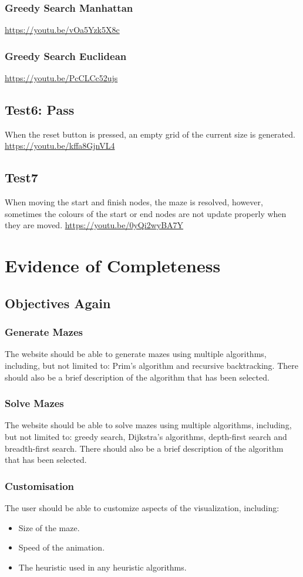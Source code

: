 \documentclass[titlepage]{article}
\begin{document}
\subsubsection{Greedy Search Manhattan}
\url{https://youtu.be/vOa5Yzk5X8c}
\subsubsection{Greedy Search Euclidean}
\url{https://youtu.be/PcCLCc52ujs}
\subsection{Test6: Pass}
When the reset button is pressed, an empty grid of the current size is generated. \url{https://youtu.be/kffa8GjnVL4}
\subsection{Test7}
When moving the start and finish nodes, the maze is resolved, however, sometimes the colours of the start or end nodes are not update properly when they are moved.
\url{https://youtu.be/0yQi2wyBA7Y}

\section{Evidence of Completeness}  
\subsection{Objectives Again}
\subsubsection{Generate Mazes}
The website should be able to generate mazes using multiple algorithms, including, but not limited to: Prim's algorithm and recursive backtracking. There should also be a brief description of the algorithm that has been selected.

\subsubsection{Solve Mazes}
The website should be able to solve mazes using multiple algorithms, including, but not limited to: greedy search, Dijkstra's algorithms, depth-first search and breadth-first search. There should also be a brief description of the algorithm that has been selected.

\subsubsection{Customisation}
The user should be able to customize aspects of the visualization, including:
\begin{itemize}
    \item Size of the maze.
    \item Speed of the animation.
    \item The heuristic used in any heuristic algorithms.
\end{itemize}
\end{document}
